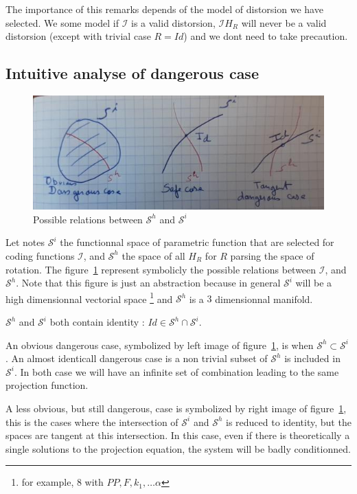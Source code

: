 The importance of this remarks depends of the model of distorsion we have selected.
We some model if $\mathcal{I}$ is a valid distorsion,  $\mathcal{I} H_{R}$ will
never be a valid distorsion (except with trivial case $R=Id$) and we dont need
to take precaution.


\subsection{Intuitive analyse of dangerous case}

\begin{figure}
\centering
\includegraphics[width=12cm]{Methods/Images/TangentSpace.jpg}\caption{Possible relations between $\mathcal{S}^h$ and $\mathcal{S}^i$}
	\label{fig:TanSpace}
\end{figure}


Let notes  $\mathcal{S}^i$ the functionnal space of parametric function  that are selected
for coding functions $\mathcal{I}$, and $\mathcal{S}^h$ the space of all $H_R$ for
$R$ parsing the space of rotation.
The figure~\ref{fig:TanSpace} represent symbolicly the possible relations between
$\mathcal{I}$, and $\mathcal{S}^h$.  Note that this figure is just an
abstraction because in general $\mathcal{S}^i$ will be a high dimensionnal
vectorial space \footnote{for example, $8$ with $PP,F,k_1,\dots\alpha$} 
and  $\mathcal{S}^h$  is a $3$ dimensionnal manifold.

$\mathcal{S}^h$ and $ \mathcal{S}^i$  both contain identity  : $Id \in \mathcal{S}^h \cap \mathcal{S}^i$. 

An obvious dangerous case, symbolized by left image of
figure~\ref{fig:TanSpace},  is when $\mathcal{S}^h \subset \mathcal{S}^i$ .
An almost identicall dangerous case is a non trivial subset of $\mathcal{S}^h$
is included in  $\mathcal{S}^i$. In both case we will have an infinite set of combination
leading to the same projection function.


A less obvious, but still dangerous, case is symbolized by right image of figure~\ref{fig:TanSpace},
this is the cases where the intersection of $\mathcal{S}^i$ and $\mathcal{S}^h$   is reduced to 
identity, but the spaces are tangent at this intersection. In this case, even if there is theoretically
a single solutions to  the projection equation, the system will be badly conditionned.

